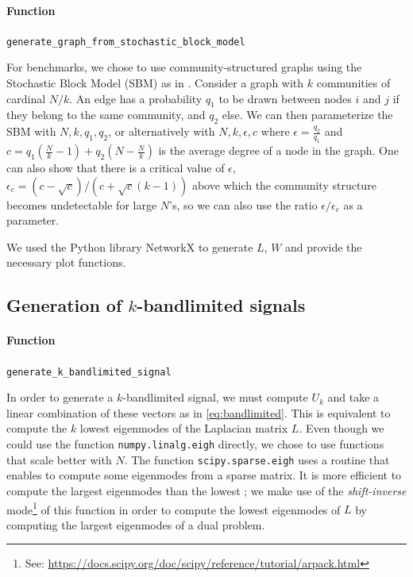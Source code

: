 \documentclass{article}
\begin{document}
\paragraph{Function} \verb#generate_graph_from_stochastic_block_model#


For benchmarks, we chose to use community-structured graphs using the Stochastic Block Model (SBM) as in \cite{tremblay2017}. Consider a graph with $k$ communities of cardinal $N/k$. An edge has a probability $q_1$ to be drawn between nodes $i$ and $j$ if they belong to the same community, and $q_2$ else. We can then parameterize the SBM with $N, k, q_1, q_2$, or alternatively with $N, k, \epsilon, c$ where $\epsilon = \frac{q_2}{q_1}$ and $c = q_1 \left( \frac{N}{k} - 1 \right) + q_2 \left(N - \frac{N}{k}\right)$ is the average degree of a node in the graph. One can also show that there is a critical value of $\epsilon$, $\epsilon_c = (c - \sqrt{c})/(c + \sqrt{c}(k-1))$ above which the community structure becomes undetectable for large $N$'s, so we can also use the ratio $\epsilon/\epsilon_c$ as a parameter.


We used the Python library NetworkX \cite{hagberg2008} to generate $L$, $W$ and provide the necessary plot functions. 


\subsection[Generation of k-bandlimited signals]{Generation of $k$-bandlimited signals} \label{subsec:gen:k:bandlimited}


\paragraph{Function} \verb#generate_k_bandlimited_signal#


In order to generate a $k$-bandlimited signal, we must compute $U_k$ and take a linear combination of these vectors as in \eqref{eq:bandlimited}. This is equivalent to compute the $k$ lowest eigenmodes of the Laplacian matrix $L$. Even though we could use the function \verb#numpy.linalg.eigh# directly, we chose to use functions that scale better with $N$. The function \verb#scipy.sparse.eigh# uses a routine that enables to compute some eigenmodes from a sparse matrix. It is more efficient to compute the largest eigenmodes than the lowest ; we make use of the \emph{shift-inverse} mode\footnote{See: \url{https://docs.scipy.org/doc/scipy/reference/tutorial/arpack.html}} of this function in order to compute the lowest eigenmodes of $L$ by computing the largest eigenmodes of a dual problem.
\end{document}
